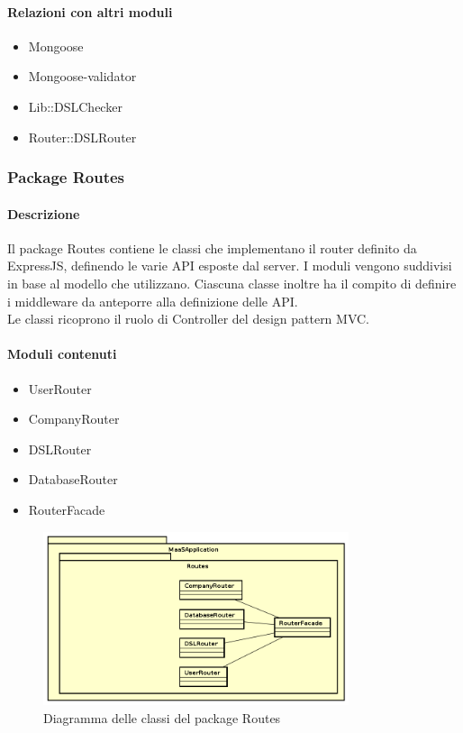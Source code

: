 \paragraph*{Relazioni con altri moduli}
\begin{itemize}
\item Mongoose
\item Mongoose-validator
\item Lib::DSLChecker
\item Router::DSLRouter
\end{itemize}


\subsubsection{Package Routes}
\paragraph*{Descrizione}
Il package Routes contiene le classi che implementano il router definito da ExpressJS, definendo le varie API esposte dal server.
I moduli vengono suddivisi in base al modello che utilizzano. 
Ciascuna classe inoltre ha il compito di definire i middleware da anteporre alla definizione delle API.\\
Le classi ricoprono il ruolo di Controller del design pattern MVC.

\paragraph*{Moduli contenuti}
\begin{itemize}
\item UserRouter
\item CompanyRouter
\item DSLRouter
\item DatabaseRouter
\item RouterFacade
\end{itemize}

\begin{figure}[H]
\centering
\includegraphics[width=0.8\textwidth]{res/sections/backend/routes.png}
\caption{Diagramma delle classi del package Routes}
\end{figure}

